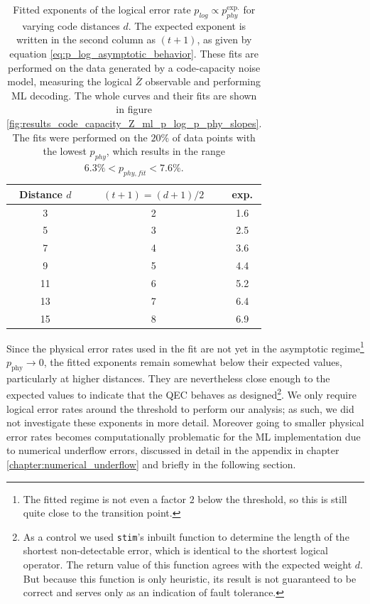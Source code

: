 \begin{table}[th]
    \centering
    \begin{tabular}{c|c|c}
        \hline
        Distance $d$ &  $(t+1)=(d+1)/2$ & exp.\\
        \hline
        3  & 2 & 1.6\\
        5  & 3 & 2.5\\
        7  & 4 & 3.6\\
        9  & 5 & 4.4\\
        11 & 6 & 5.2\\
        13 & 7 & 6.4\\
        15 & 8 & 6.9\\
        \hline
    \end{tabular}
    \caption{
        Fitted exponents of the logical error rate $p_{log} \propto p_{phy}^{\text{exp.}}$ for varying code distances $d$.
        The expected exponent is written in the second column as $(t+1)$, as given by equation \eqref{eq:p_log_asymptotic_behavior}.
        These fits are performed on the data generated by a code-capacity noise model, measuring the logical $\bar{Z}$ observable and performing ML decoding.
        The whole curves and their fits are shown in figure \ref{fig:results_code_capacity_Z_ml_p_log_p_phy_slopes}.
        The fits were performed on the $20\%$ of data points with the lowest $p_{phy}$, which results in the range $6.3\% < p_{phy,fit} < 7.6\%$.
    }
    \label{tab:fit_exponents}
\end{table}
Since the physical error rates used in the fit are not yet in the asymptotic regime\footnote{
    The fitted regime is not even a factor $2$ below the threshold, so this is still quite close to the transition point.
} $p_{\mathrm{phy}}\rightarrow 0$, 
the fitted exponents remain somewhat below their expected values, particularly at higher distances.
They are nevertheless close enough to the expected values to indicate that the QEC behaves as designed\footnote{
    As a control we used \texttt{stim}'s inbuilt function to determine the length of the shortest non-detectable error, which is identical to the shortest logical operator.
    The return value of this function agrees with the expected weight $d$. 
    But because this function is only heuristic, its result is not guaranteed to be correct and serves only as an indication of fault tolerance.
}.
We only require logical error rates around the threshold to perform our analysis; as such, we did not investigate these exponents in more detail. 
Moreover going to smaller physical error rates becomes computationally problematic for the ML implementation due to numerical underflow errors, 
discussed in detail in the appendix in chapter \ref{chapter:numerical_underflow} and briefly in the following section.

